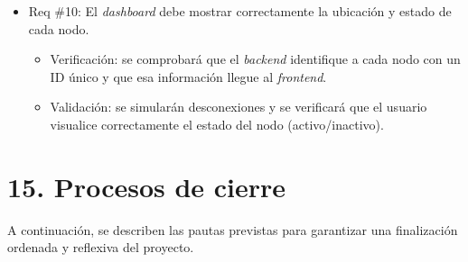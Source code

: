 \documentclass[
11pt, %
]{charter}
\begin{document}
\begin{itemize}
\item Req \#10: El \textit{dashboard} debe mostrar correctamente la ubicación y estado de cada nodo.
\begin{itemize}
	\item Verificación: se comprobará que el \textit{backend} identifique a cada nodo con un ID único y que esa información llegue al 
    \textit{frontend}.
	\item Validación: se simularán desconexiones y se verificará que el usuario visualice correctamente el estado del nodo 
    (activo/inactivo).
\end{itemize}

\end{itemize}



\newpage
\section{15. Procesos de cierre}    
\label{sec:cierre}

A continuación, se describen las pautas previstas para garantizar una finalización ordenada y reflexiva del proyecto.
\end{document}
